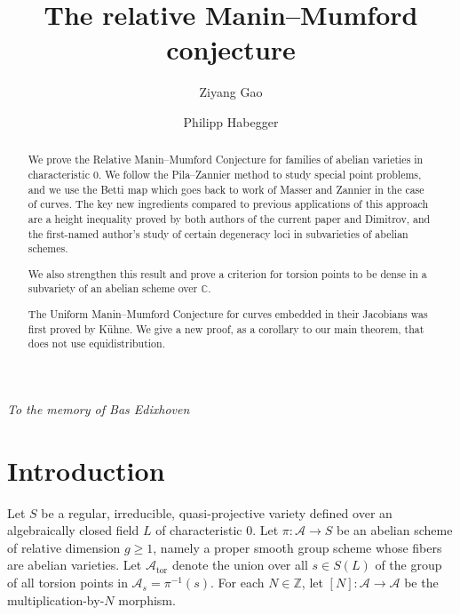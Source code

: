 \documentclass[12pt,oneside]{amsart}
\numberwithin{maincounter}{section}
\numberwithin{equation}{section}
\def\CC{\mathbb{C}}
\newcommand{\cal}{\mathcal}
\newcommand{\cA}{\cal{A}}
\newcommand{\IC}{{\CC}}
\begin{document}
\title{The relative Manin--Mumford conjecture}
\author{Ziyang Gao}
\author{Philipp Habegger}

\address{Department of Mathematics, UCLA, Los Angeles, CA 90095, USA}
\address{Department of Mathematics and Computer Science; University of Basel; Spiegelgasse 1, 4051 Basel, Switzerland}



\maketitle

{\centering\footnotesize \textit{To the memory of Bas Edixhoven}\par}

\begin{abstract}
  We prove the Relative Manin--Mumford Conjecture for
  families of abelian varieties in characteristic $0$. We follow the
  Pila--Zannier method to study special point problems, and we use the Betti map which 
  goes back to work of Masser and Zannier in the case of curves. The key
  new ingredients compared to previous applications of this approach are
  a height inequality proved by both authors of the current paper and
  Dimitrov, and the first-named author's study of certain degeneracy
  loci in subvarieties of abelian schemes.
  
  We also strengthen this result and prove a criterion for torsion points to be dense in a subvariety of an abelian scheme over $\IC$.

  The Uniform Manin--Mumford
  Conjecture for curves embedded in their Jacobians was first proved
  by K\"uhne. We give a new  proof, as a corollary to our main theorem, that does
  not use equidistribution.  
\end{abstract}
\tableofcontents


\section{Introduction}

Let $S$ be a regular, irreducible, quasi-projective
variety defined over an algebraically closed  field $L$ of characteristic $0$. Let $\pi
\colon \cA \rightarrow S$ be an abelian scheme of relative dimension
$g  \ge 1$, namely a proper smooth group scheme whose fibers are
abelian varieties.
Let $\cA_{\mathrm{tor}}$ denote the union over all $s\in S(L)$ of
the group of all torsion points in $\cA_s = \pi^{-1}(s)$. For each $N
\in \mathbb{Z}$, let $[N] \colon \cA \rightarrow \cA$ be the
multiplication-by-$N$ morphism.
\end{document}
